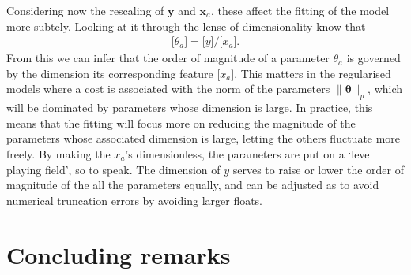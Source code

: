 \documentclass[twocolumn,english,notitlepage]{article}
\renewcommand{\vec}[1]{\boldsymbol{#1}}
\renewcommand{\norm}[2][]{\ensuremath{\|#2\|_{#1}}}
\newcommand{\dimof}[1]{\bigl[#1\bigr]}
\begin{document}
        Considering now the rescaling of $\vec{y}$ and $\vec{x}_a$, these affect the fitting of the model more subtely. Looking at it through the lense of dimensionality know that
        \begin{align}
            \dimof{\theta_a} = \dimof{y} / \dimof{x_a}.
        \end{align}
        From this we can infer that the order of magnitude of a parameter $\theta_a$ is governed by the dimension its corresponding feature $\dimof{x_a}$. This matters in the regularised models where a cost is associated with the norm of the parameters $\norm[p]{\vec{\theta}}$, which will be dominated by parameters whose dimension is large. In practice, this means that the fitting will focus more on reducing the magnitude of the parameters whose associated dimension is large, letting the others fluctuate more freely. By making the $x_a$'s dimensionless, the parameters are put on a `level playing field', so to speak. The dimension of $y$ serves to raise or lower the order of magnitude of the all the parameters equally, and can be adjusted as to avoid numerical truncation errors by avoiding larger floats.


\section{Concluding remarks}
\end{document}

